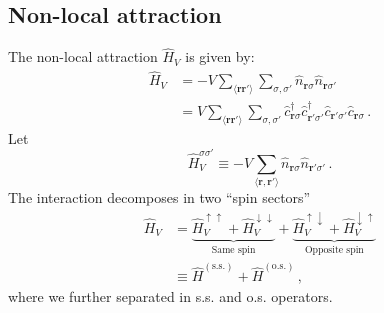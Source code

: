 \subsection{Non-local attraction}\label{subsec:ehm-sym-break-HV}

The non-local attraction $\hat H_V$ is given by:
\begin{align}
	\hat H_V &= -V \sum_{\langle \mathbf{r}\mathbf{r}' \rangle} \sum_{\sigma,\sigma'} \hat n_{\mathbf{r}\sigma} \hat n_{\mathbf{r}\sigma'} \label{eq:ehm-HV-full} \\
	&= V \sum_{\langle \mathbf{r}\mathbf{r}' \rangle} \sum_{\sigma,\sigma'} \hat c_{\mathbf{r}\sigma}^\dagger \hat c_{\mathbf{r}'\sigma'}^\dagger \hat c_{\mathbf{r}'\sigma'} \hat c_{\mathbf{r}\sigma} \nonumber \, .
\end{align}
Let
\[
	\hat H_V^{\sigma\sigma'} \equiv - V \sum_{\langle \mathbf{r},\mathbf{r}' \rangle} \hat n_{\mathbf{r}\sigma} \hat n_{\mathbf{r}'\sigma'} \, .
\]
The interaction decomposes in two ``spin sectors''
\begin{align}
	\hat H_V &= 
	\underbrace{
		\hat H_V^{\uparrow\uparrow} + \hat H_V^{\downarrow\downarrow}
	}_{\text{Same spin}} +
	\underbrace{
		\hat H_V^{\uparrow\downarrow} + \hat H_V^{\downarrow\uparrow}
	}_{\text{Opposite spin}} \nonumber \\
	&\equiv \hat H^{(\mathrm{s.s.})} + \hat H^{(\mathrm{o.s.})} \label{eq:ehm-HV(ss)+HV(os)} \, ,
\end{align}
where we further separated in s.s. and o.s. operators.

